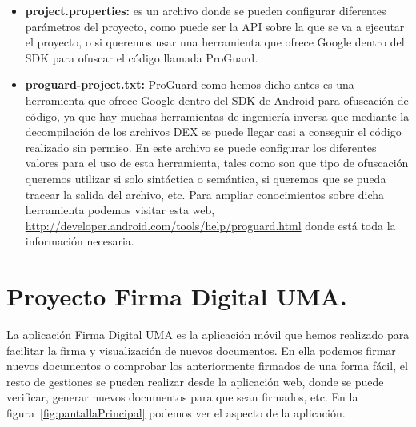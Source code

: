 \begin{itemize}
\item \textbf{project.properties:} es un archivo donde se pueden configurar diferentes parámetros del proyecto, como puede ser la API sobre la que se va a ejecutar el proyecto, o si queremos usar una herramienta que ofrece Google dentro del SDK para ofuscar el código llamada ProGuard.

\item \textbf{proguard-project.txt:} ProGuard como hemos dicho antes es una herramienta que ofrece Google dentro del SDK de Android para ofuscación de código, ya que hay muchas herramientas de ingeniería inversa que mediante la decompilación de los archivos DEX se puede llegar casi a conseguir el código realizado sin permiso. En este archivo se puede configurar los diferentes valores para el uso de esta herramienta, tales como son que tipo de ofuscación queremos utilizar si solo sintáctica o semántica, si queremos que se pueda tracear la salida del archivo, etc. Para ampliar conocimientos sobre dicha herramienta podemos visitar esta web, \url{http://developer.android.com/tools/help/proguard.html} donde está toda la información necesaria.

\end{itemize}


\section{Proyecto Firma Digital UMA.}

La aplicación Firma Digital UMA es la aplicación móvil que hemos realizado para facilitar la firma y visualización de nuevos documentos. En ella  podemos firmar nuevos documentos o comprobar los anteriormente firmados de una forma fácil, el resto de gestiones se pueden realizar desde la aplicación web, donde se puede verificar, generar nuevos documentos para que sean firmados, etc. En la figura~\ref{fig:pantallaPrincipal} podemos ver el aspecto de la aplicación.

